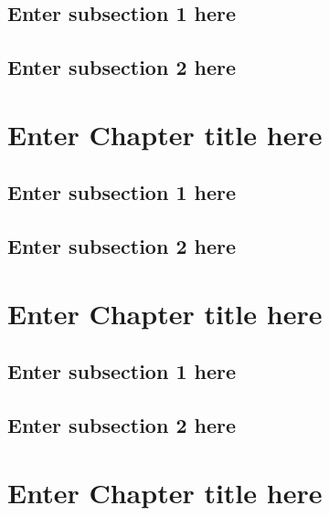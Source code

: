 \documentclass[
]{book}
\begin{document}
\hypertarget{enter-subsection-1-here-2}{%
\section{Enter subsection 1 here}\label{enter-subsection-1-here-2}}

\hypertarget{enter-subsection-2-here-2}{%
\section{Enter subsection 2 here}\label{enter-subsection-2-here-2}}

\hypertarget{ch5}{%
\chapter{Enter Chapter title here}\label{ch5}}

\hypertarget{enter-subsection-1-here-3}{%
\section{Enter subsection 1 here}\label{enter-subsection-1-here-3}}

\hypertarget{enter-subsection-2-here-3}{%
\section{Enter subsection 2 here}\label{enter-subsection-2-here-3}}

\hypertarget{ch6}{%
\chapter{Enter Chapter title here}\label{ch6}}

\hypertarget{enter-subsection-1-here-4}{%
\section{Enter subsection 1 here}\label{enter-subsection-1-here-4}}

\hypertarget{enter-subsection-2-here-4}{%
\section{Enter subsection 2 here}\label{enter-subsection-2-here-4}}

\hypertarget{ch7}{%
\chapter{Enter Chapter title here}\label{ch7}}
\end{document}
